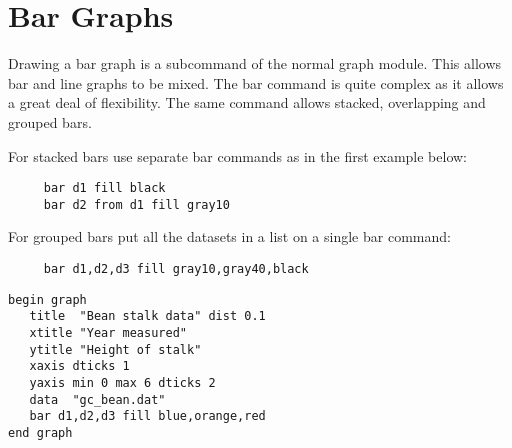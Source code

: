 \section{Bar Graphs}
\label{cmd:bar}
Drawing a bar graph is a subcommand of the normal graph module. This allows
bar and line graphs to be mixed.
The bar command is quite complex as it allows a
great deal of flexibility.  The same command allows stacked, overlapping and
grouped bars.

For stacked bars use separate bar commands as in the first
example below:

\preglecode{}
\begin{Verbatim}
     bar d1 fill black
     bar d2 from d1 fill gray10
\end{Verbatim}
\postglecode{}

For grouped bars put all the datasets in a list on a single bar
command:

\preglecode{}
\begin{Verbatim}
     bar d1,d2,d3 fill gray10,gray40,black
\end{Verbatim}
\postglecode{}

\begin{minipage}[c]{8cm}
\begin{Verbatim}
begin graph
   title  "Bean stalk data" dist 0.1
   xtitle "Year measured"
   ytitle "Height of stalk"
   xaxis dticks 1
   yaxis min 0 max 6 dticks 2
   data  "gc_bean.dat"
   bar d1,d2,d3 fill blue,orange,red
end graph
\end{Verbatim}
\end{minipage}
\hfill
\begin{minipage}[c]{7cm}
\mbox{}
\end{minipage}

